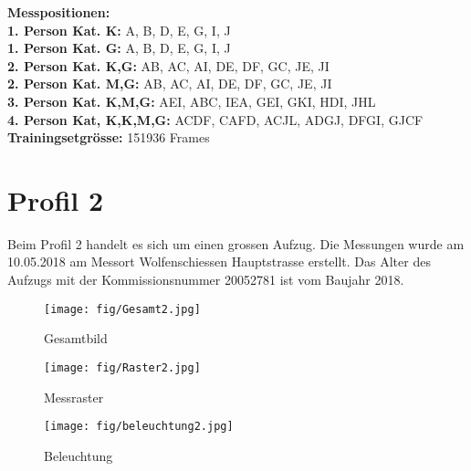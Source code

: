  \textbf{Messpositionen:}\\
\textbf{1. Person Kat. K:} A, B, D, E, G, I, J\\
\textbf{1. Person Kat. G:} A, B, D, E, G, I, J\\
\textbf{2. Person Kat. K,G:} AB, AC, AI, DE, DF, GC, JE, JI  \\
\textbf{2. Person Kat. M,G:} AB, AC, AI, DE, DF, GC, JE, JI  \\
\textbf{3. Person Kat. K,M,G:} AEI, ABC, IEA, GEI, GKI, HDI, JHL \\
\textbf{4. Person Kat, K,K,M,G:} ACDF, CAFD, ACJL, ADGJ, DFGI, GJCF \\
\textbf{Trainingsetgrösse:}         151936 Frames \\
	
	\newpage
	
	
	\section{Profil 2}
Beim Profil 2 handelt es sich um einen grossen Aufzug. Die Messungen wurde am 10.05.2018 am Messort Wolfenschiessen Hauptstrasse erstellt. Das Alter des Aufzugs mit der Kommissionsnummer 20052781 ist vom Baujahr 2018.

	
	
		\begin{figure}[!ht]
	\centering
	\begin{minipage}[b]{0.3\linewidth}
		\centering
		\texttt{[image: fig/Gesamt2.jpg]}
		\caption{Gesamtbild}
		\label{fig:profilAnhang4}
	\end{minipage}
	\begin{minipage}[b]{0.3\linewidth}
		\centering
		\texttt{[image: fig/Raster2.jpg]}
		\caption{Messraster}
		\label{fig:profilAnhang5}
	\end{minipage}
	\begin{minipage}[b]{0.3\linewidth}
		\centering
		\texttt{[image: fig/beleuchtung2.jpg]}
		\caption{Beleuchtung}
		\label{fig:profilAnhang6}
	\end{minipage}
\end{figure}

